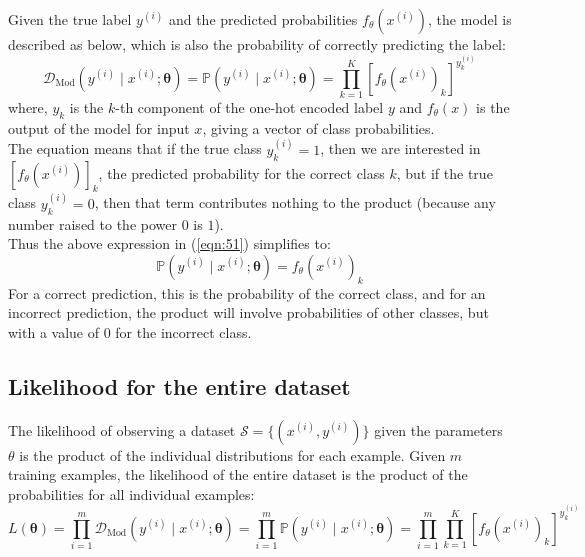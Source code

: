 Given the true label $y^{(i)}$ and the predicted probabilities $f_{\theta}(x^{(i)})$, the model is described as below, which is also the probability of correctly predicting the label:
\begin{equation}
    \mathcal{D}_{\text{Mod}}(y^{(i)} \mid x^{(i)}; \boldsymbol{\theta}) = \mathbb{P}(y^{(i)} \mid x^{(i)}; \boldsymbol{\theta}) = \prod_{k=1}^{K}[f_{\theta}(x^{(i)})_k]^{y_k^{(i)}}
    \label{eqn:51}
\end{equation}
where, $y_k$ is the $k$-th component of the one-hot encoded label $y$ and $f_{\theta}(x)$ is the output of the model for input $x$, giving a vector of class probabilities.\\

The equation means that if the true class $y_k^{(i)} = 1$, then we are interested in $[f_{\theta}(x^{(i)})]_k$, the predicted probability for the correct class $k$, but if the true class $y_k^{(i)} = 0$, then that term contributes nothing to the product (because any number raised to the power $0$ is $1$).\\

Thus the above expression in (\ref{eqn:51}) simplifies to:
\begin{equation}
    \mathbb{P}(y^{(i)} \mid x^{(i)}; \boldsymbol{\theta}) = f_{\theta}(x^{(i)})_k
    \label{eqn:52}
\end{equation}
For a correct prediction, this is the probability of the correct class, and for an incorrect prediction, the product will involve probabilities of other classes, but with a value of $0$ for the incorrect class.

\subsection{Likelihood for the entire dataset}
The likelihood of observing a dataset $\mathcal{S} = \{(x^{(i)}, y^{(i)})\}$ given the parameters $\theta$ is the product of the individual distributions for each example. Given $m$ training examples, the likelihood of the entire dataset is the product of the probabilities for all individual examples:
\begin{equation}
    L(\boldsymbol{\theta}) = \prod_{i=1}^{m} \mathcal{D}_{\text{Mod}}(y^{(i)} \mid x^{(i)}; \boldsymbol{\theta}) = \prod_{i=1}^{m} \mathbb{P}(y^{(i)} \mid x^{(i)}; \boldsymbol{\theta}) = \prod_{i=1}^{m} \prod_{k=1}^{K}[f_{\theta}(x^{(i)})_k]^{y_k^{(i)}}
    \label{eqn:53}
\end{equation}

